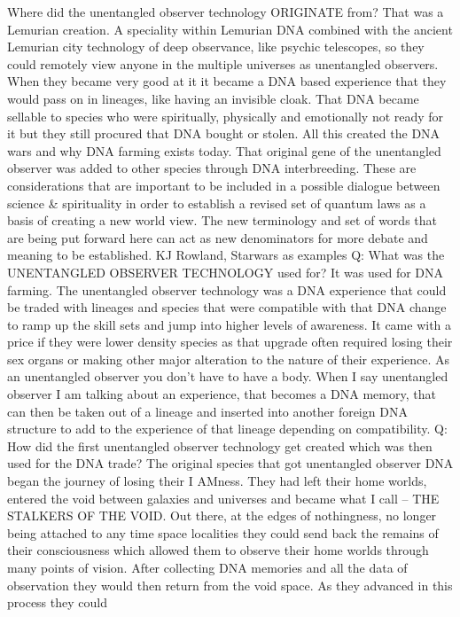 Where did the unentangled observer technology ORIGINATE from? That was a
Lemurian creation. A speciality within Lemurian DNA combined with the
ancient Lemurian city technology of deep observance, like psychic
telescopes, so they could remotely view anyone in the multiple universes
as unentangled observers. When they became very good at it it became a
DNA based experience that they would pass on in lineages, like having an
invisible cloak. That DNA became sellable to species who were
spiritually, physically and emotionally not ready for it but they still
procured that DNA bought or stolen. All this created the DNA wars and
why DNA farming exists today. That original gene of the unentangled
observer was added to other species through DNA interbreeding. These are
considerations that are important to be included in a possible dialogue
between science \& spirituality in order to establish a revised set of
quantum laws as a basis of creating a new world view. The new
terminology and set of words that are being put forward here can act as
new denominators for more debate and meaning to be established. KJ
Rowland, Starwars as examples Q: What was the UNENTANGLED OBSERVER
TECHNOLOGY used for? It was used for DNA farming. The unentangled
observer technology was a DNA experience that could be traded with
lineages and species that were compatible with that DNA change to ramp
up the skill sets and jump into higher levels of awareness. It came with
a price if they were lower density species as that upgrade often
required losing their sex organs or making other major alteration to the
nature of their experience. As an unentangled observer you don't have to
have a body. When I say unentangled observer I am talking about an
experience, that becomes a DNA memory, that can then be taken out of a
lineage and inserted into another foreign DNA structure to add to the
experience of that lineage depending on compatibility. Q: How did the
first unentangled observer technology get created which was then used
for the DNA trade? The original species that got unentangled observer
DNA began the journey of losing their I AMness. They had left their home
worlds, entered the void between galaxies and universes and became what
I call -- THE STALKERS OF THE VOID. Out there, at the edges of
nothingness, no longer being attached to any time space localities they
could send back the remains of their consciousness which allowed them to
observe their home worlds through many points of vision. After
collecting DNA memories and all the data of observation they would then
return from the void space. As they advanced in this process they could
